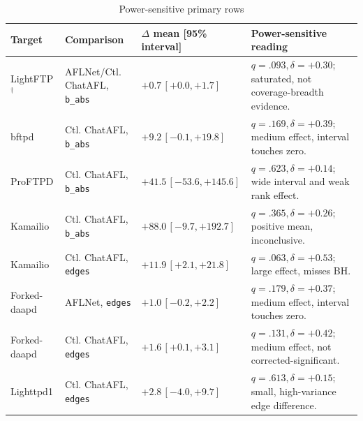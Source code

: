 \documentclass[final,5p,times,number]{elsarticle}
\begin{document}
\begin{table}[!t]
\centering
\caption{Power-sensitive primary rows}
\label{tab:primary_power_sensitive}
{\scriptsize
\setlength{\tabcolsep}{3.0pt}
\renewcommand{\arraystretch}{0.90}
\begin{tabularx}{\textwidth}{>{\raggedright\arraybackslash}p{}
                            >{\raggedright\arraybackslash}p{}
                            >{\centering\arraybackslash}p{}
                            X}
\toprule
Target & Comparison & $\Delta$ mean [95\% interval] & Power-sensitive reading \\
\midrule
LightFTP$^\dagger$ & AFLNet/Ctl. ChatAFL, \texttt{b\_abs} & $+0.7\,[+0.0,+1.7]$ & $q=.093,\delta=+0.30$; saturated, not coverage-breadth evidence. \\
bftpd & Ctl. ChatAFL, \texttt{b\_abs} & $+9.2\,[-0.1,+19.8]$ & $q=.169,\delta=+0.39$; medium effect, interval touches zero. \\
ProFTPD & Ctl. ChatAFL, \texttt{b\_abs} & $+41.5\,[-53.6,+145.6]$ & $q=.623,\delta=+0.14$; wide interval and weak rank effect. \\
Kamailio & Ctl. ChatAFL, \texttt{b\_abs} & $+88.0\,[-9.7,+192.7]$ & $q=.365,\delta=+0.26$; positive mean, inconclusive. \\
Kamailio & Ctl. ChatAFL, \texttt{edges} & $+11.9\,[+2.1,+21.8]$ & $q=.063,\delta=+0.53$; large effect, misses BH. \\
Forked-daapd & AFLNet, \texttt{edges} & $+1.0\,[-0.2,+2.2]$ & $q=.179,\delta=+0.37$; medium effect, interval touches zero. \\
Forked-daapd & Ctl. ChatAFL, \texttt{edges} & $+1.6\,[+0.1,+3.1]$ & $q=.131,\delta=+0.42$; medium effect, not corrected-significant. \\
Lighttpd1 & Ctl. ChatAFL, \texttt{edges} & $+2.8\,[-4.0,+9.7]$ & $q=.613,\delta=+0.15$; small, high-variance edge difference. \\
\bottomrule
\end{tabularx}
}
\end{table}
\end{document}
